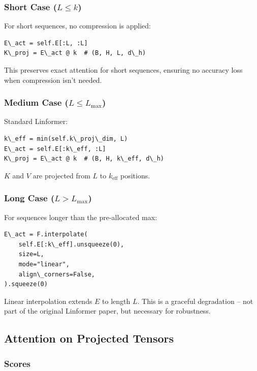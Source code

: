 \subsubsection{Short Case ($L \leq k$)}

For short sequences, no compression is applied:

\begin{lstlisting}
E\_act = self.E[:L, :L]
K\_proj = E\_act @ k  # (B, H, L, d\_h)
\end{lstlisting}

This preserves exact attention for short sequences, ensuring no accuracy 
loss when compression isn't needed.

\subsubsection{Medium Case ($L \leq L_\text{max}$)}

Standard Linformer:

\begin{lstlisting}
k\_eff = min(self.k\_proj\_dim, L)
E\_act = self.E[:k\_eff, :L]
K\_proj = E\_act @ k  # (B, H, k\_eff, d\_h)
\end{lstlisting}

$K$ and $V$ are projected from $L$ to $k_\text{eff}$ positions.

\subsubsection{Long Case ($L > L_\text{max}$)}

For sequences longer than the pre-allocated max:

\begin{lstlisting}
E\_act = F.interpolate(
    self.E[:k\_eff].unsqueeze(0),
    size=L,
    mode="linear",
    align\_corners=False,
).squeeze(0)
\end{lstlisting}

Linear interpolation extends $E$ to length $L$. This is a graceful 
degradation -- not part of the original Linformer paper, but necessary for 
robustness.

\subsection{Attention on Projected Tensors}

\subsubsection{Scores}

